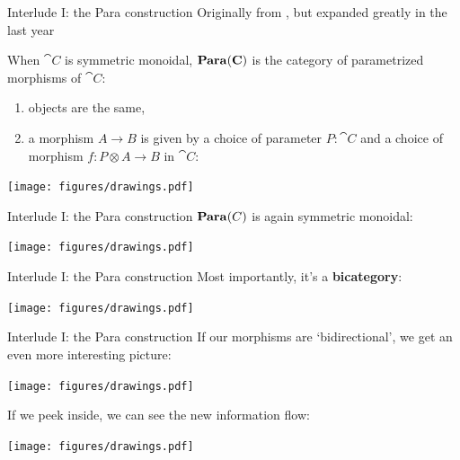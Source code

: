 \begin{frame}{Interlude I: the Para construction}
	Originally from \cite{fong2019backprop}, but expanded greatly in the last year

	\begin{definition}
		When $\cat C$ is symmetric monoidal, $\mathbf{Para}(\mathbf{C})$ is the category of parametrized morphisms of $\cat C$:
		\begin{enumerate}
			\item objects are the same,
			\item a morphism $A \to B$ is given by a choice of parameter $P : \cat C$ and a choice of morphism $f:P \otimes A \to B$ in $\cat C$:
		\end{enumerate}
	\end{definition}

	\begin{center}
		\texttt{[image: figures/drawings.pdf]}
	\end{center}
\end{frame}


\begin{frame}{Interlude I: the Para construction}
	$\mathbf{Para}(C)$ is again symmetric monoidal:

	\vfill
	\begin{center}
		\texttt{[image: figures/drawings.pdf]}
	\end{center}
\end{frame}

\begin{frame}{Interlude I: the Para construction}
	Most importantly, it's a \textbf{bicategory}:

	\begin{center}
		\texttt{[image: figures/drawings.pdf]}
	\end{center}
\end{frame}

\begin{frame}{Interlude I: the Para construction}
	If our morphisms are `bidirectional', we get an even more interesting picture:

	\begin{center}
		\texttt{[image: figures/drawings.pdf]}
	\end{center}

	If we peek inside, we can see the new information flow:

	\begin{center}
		\texttt{[image: figures/drawings.pdf]}
	\end{center}
\end{frame}

